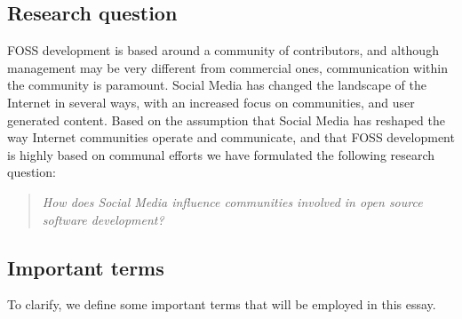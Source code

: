 \documentclass[a4paper,11pt]{article} %
\begin{document}
\subsection{Research question}

FOSS development is based around a community of
contributors, and although management may be very different from commercial
ones, communication within the community is paramount. Social Media has
changed the landscape of the Internet in several ways, with an increased
focus on communities, and user generated content\cite{Kaplan201059}.
Based on the assumption that Social Media has reshaped the way Internet communities
operate and communicate, and that FOSS development is highly based on communal efforts
we have formulated the following research question:
\begin{quote}
  \textit{How does Social Media influence communities involved in open source
    software development?}
\end{quote}



\subsection{Important terms}

To clarify, we define some important terms that will be employed in this essay.
\end{document}
